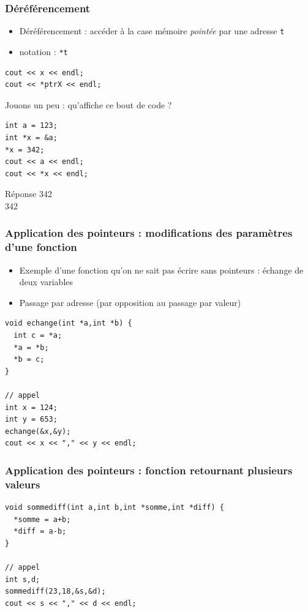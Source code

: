 \begin{frame}[fragile]
\frametitle{Déréférencement}
\begin{itemize}
\item Déréférencement : accéder à la case mémoire \textit{pointée} par une adresse \texttt{t}
\item notation : \texttt{*t}
\end{itemize}
\begin{lstlisting}
cout << x << endl;
cout << *ptrX << endl;
\end{lstlisting}
\pause\begin{exampleblock}{Jouons un peu : qu'affiche ce bout de code ?}
\begin{lstlisting}
int a = 123;
int *x = &a;
*x = 342;
cout << a << endl;
cout << *x << endl;
\end{lstlisting}
\end{exampleblock}
\pause\begin{block}{Réponse}
342 \\
342
\end{block}
\end{frame}



\begin{frame}[fragile]
\frametitle{Application des pointeurs : modifications des paramètres d'une fonction}
\begin{itemize}
\item Exemple d'une fonction qu'on ne sait pas écrire sans pointeurs : échange de deux variables
\item Passage par adresse (par opposition au passage par valeur)
\end{itemize}
\begin{lstlisting}
void echange(int *a,int *b) {
  int c = *a;
  *a = *b;
  *b = c;
}

// appel
int x = 124;
int y = 653;
echange(&x,&y);
cout << x << "," << y << endl;
\end{lstlisting}

\end{frame}

\begin{frame}[fragile]
\frametitle{Application des pointeurs : fonction retournant plusieurs valeurs}
\begin{lstlisting}
void sommediff(int a,int b,int *somme,int *diff) {
  *somme = a+b;
  *diff = a-b;
}

// appel
int s,d;
sommediff(23,18,&s,&d);
cout << s << "," << d << endl;
\end{lstlisting}

\end{frame}

